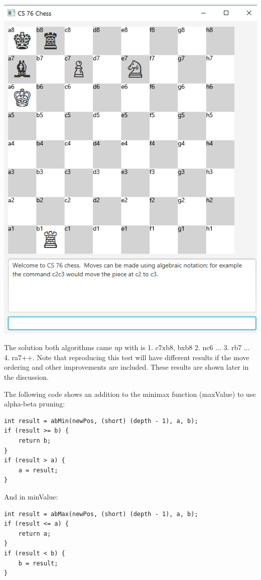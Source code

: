\documentclass[10pt]{article}
\begin{document}
\includegraphics[scale=0.4]{MinimaxTest1}

The solution both algorithms came up with is 1. c7xb8, bxb8 2. nc6 ... 3. rb7 ... 4. ra7++. Note that reproducing this test will have different results if the move ordering and other improvements are included. These results are shown later in the discussion.

The following code shows an addition to the minimax function (maxValue) to use alpha-beta pruning:

\begin{lstlisting}
int result = abMin(newPos, (short) (depth - 1), a, b);
if (result >= b) {
	return b;
}
if (result > a) {
	a = result;
}
\end{lstlisting}

And in minValue:

\begin{lstlisting}
int result = abMax(newPos, (short) (depth - 1), a, b);
if (result <= a) {
	return a;
}
if (result < b) {
	b = result;
}
\end{lstlisting}
\end{document}
